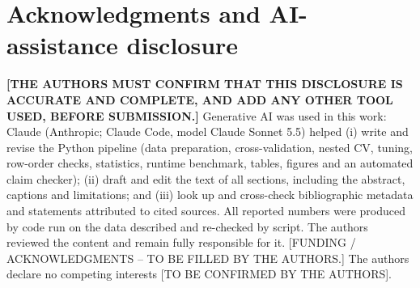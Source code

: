 \documentclass[runningheads]{llncs}
\begin{document}
\section*{Acknowledgments and AI-assistance disclosure}
\textbf{[THE AUTHORS MUST CONFIRM THAT THIS DISCLOSURE IS ACCURATE AND COMPLETE, AND ADD ANY OTHER TOOL USED, BEFORE SUBMISSION.]} Generative AI was used in this work: Claude (Anthropic; Claude Code, model Claude Sonnet 5.5) helped (i) write and revise the Python pipeline (data preparation, cross-validation, nested CV, tuning, row-order checks, statistics, runtime benchmark, tables, figures and an automated claim checker); (ii) draft and edit the text of all sections, including the abstract, captions and limitations; and (iii) look up and cross-check bibliographic metadata and statements attributed to cited sources. All reported numbers were produced by code run on the data described and re-checked by script. The authors reviewed the content and remain fully responsible for it. [FUNDING / ACKNOWLEDGMENTS -- TO BE FILLED BY THE AUTHORS.] The authors declare no competing interests [TO BE CONFIRMED BY THE AUTHORS].



\end{document}
